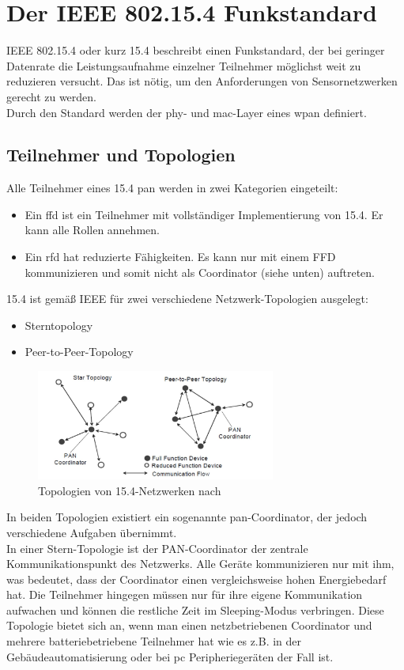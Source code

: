 \section{Der IEEE 802.15.4 Funkstandard}
IEEE 802.15.4 oder kurz 15.4 beschreibt einen Funkstandard, der bei geringer Datenrate die Leistungsaufnahme einzelner Teilnehmer möglichst weit zu reduzieren versucht. Das ist nötig, um den Anforderungen von Sensornetzwerken gerecht zu werden. \\
Durch den Standard werden der \ac{phy}- und \ac{mac}-Layer eines \ac{wpan} definiert. \\

\subsection{Teilnehmer und Topologien}
Alle Teilnehmer eines 15.4 \ac{pan} werden in zwei Kategorien eingeteilt:
\begin{itemize}
	\item Ein \ac{ffd} ist ein Teilnehmer mit vollständiger Implementierung von 15.4. Er kann alle Rollen annehmen.
	\item Ein \ac{rfd} hat reduzierte Fähigkeiten. Es kann nur mit einem FFD kommunizieren und somit nicht als Coordinator (siehe unten) auftreten.
\end{itemize}
15.4 ist gemäß IEEE für zwei verschiedene Netzwerk-Topologien ausgelegt:
\begin{itemize}
	\item Sterntopology
	\item Peer-to-Peer-Topology
\end{itemize}
\begin{figure}
	\centering
	\includegraphics[width=0.7\textwidth]{Grafiken-Alex/topology.jpg}
	\caption{Topologien von 15.4-Netzwerken nach \cite[S.46]{ieee154}}
	\label{topology}
\end{figure}
In beiden Topologien existiert ein sogenannte \ac{pan}-Coordinator, der jedoch verschiedene Aufgaben übernimmt.\\
In einer Stern-Topologie ist der PAN-Coordinator der zentrale Kommunikationspunkt des Netzwerks. Alle Geräte kommunizieren nur mit ihm, was bedeutet, dass der Coordinator einen vergleichsweise hohen Energiebedarf hat. Die Teilnehmer hingegen müssen nur für ihre eigene Kommunikation aufwachen und können die restliche Zeit im Sleeping-Modus verbringen. Diese Topologie bietet sich an, wenn man einen netzbetriebenen Coordinator und mehrere batteriebetriebene Teilnehmer hat wie es z.B. in der Gebäudeautomatisierung oder bei \ac{pc} Peripheriegeräten der Fall ist.\\
